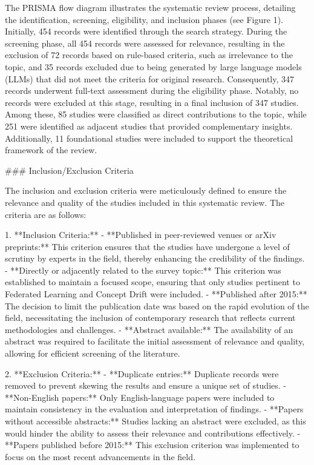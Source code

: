 \documentclass[journal]{IEEEtran}
\begin{document}
The PRISMA flow diagram illustrates the systematic review process, detailing the identification, screening, eligibility, and inclusion phases (see Figure 1). Initially, 454 records were identified through the search strategy. During the screening phase, all 454 records were assessed for relevance, resulting in the exclusion of 72 records based on rule-based criteria, such as irrelevance to the topic, and 35 records excluded due to being generated by large language models (LLMs) that did not meet the criteria for original research. Consequently, 347 records underwent full-text assessment during the eligibility phase. Notably, no records were excluded at this stage, resulting in a final inclusion of 347 studies. Among these, 85 studies were classified as direct contributions to the topic, while 251 were identified as adjacent studies that provided complementary insights. Additionally, 11 foundational studies were included to support the theoretical framework of the review.

\#\#\# Inclusion/Exclusion Criteria

The inclusion and exclusion criteria were meticulously defined to ensure the relevance and quality of the studies included in this systematic review. The criteria are as follows:

1. **Inclusion Criteria:**
   - **Published in peer-reviewed venues or arXiv preprints:** This criterion ensures that the studies have undergone a level of scrutiny by experts in the field, thereby enhancing the credibility of the findings.
   - **Directly or adjacently related to the survey topic:** This criterion was established to maintain a focused scope, ensuring that only studies pertinent to Federated Learning and Concept Drift were included.
   - **Published after 2015:** The decision to limit the publication date was based on the rapid evolution of the field, necessitating the inclusion of contemporary research that reflects current methodologies and challenges.
   - **Abstract available:** The availability of an abstract was required to facilitate the initial assessment of relevance and quality, allowing for efficient screening of the literature.

2. **Exclusion Criteria:**
   - **Duplicate entries:** Duplicate records were removed to prevent skewing the results and ensure a unique set of studies.
   - **Non-English papers:** Only English-language papers were included to maintain consistency in the evaluation and interpretation of findings.
   - **Papers without accessible abstracts:** Studies lacking an abstract were excluded, as this would hinder the ability to assess their relevance and contributions effectively.
   - **Papers published before 2015:** This exclusion criterion was implemented to focus on the most recent advancements in the field.
\end{document}

